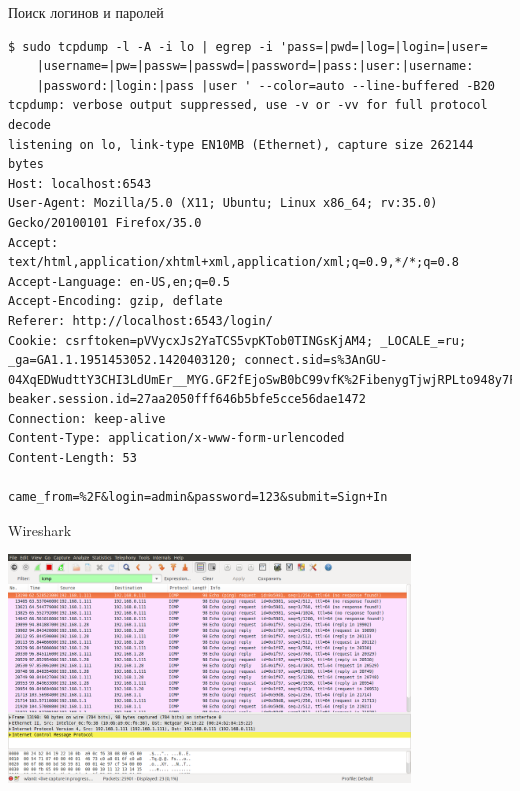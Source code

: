 \begin{frame}[fragile]{Поиск логинов и паролей}
    \begin{Verbatim}[fontsize=\scriptsize]
$ sudo tcpdump -l -A -i lo | egrep -i 'pass=|pwd=|log=|login=|user=
    |username=|pw=|passw=|passwd=|password=|pass:|user:|username:
    |password:|login:|pass |user ' --color=auto --line-buffered -B20
tcpdump: verbose output suppressed, use -v or -vv for full protocol decode
listening on lo, link-type EN10MB (Ethernet), capture size 262144 bytes
Host: localhost:6543
User-Agent: Mozilla/5.0 (X11; Ubuntu; Linux x86_64; rv:35.0) Gecko/20100101 Firefox/35.0
Accept: text/html,application/xhtml+xml,application/xml;q=0.9,*/*;q=0.8
Accept-Language: en-US,en;q=0.5
Accept-Encoding: gzip, deflate
Referer: http://localhost:6543/login/
Cookie: csrftoken=pVVycxJs2YaTCS5vpKTob0TINGsKjAM4; _LOCALE_=ru; _ga=GA1.1.1951453052.1420403120; connect.sid=s%3AnGU-04XqEDWudttY3CHI3LdUmEr__MYG.GF2fEjoSwB0bC99vfK%2FibenygTjwjRPLto948y7FSwU; beaker.session.id=27aa2050fff646b5bfe5cce56dae1472
Connection: keep-alive
Content-Type: application/x-www-form-urlencoded
Content-Length: 53

came_from=%2F&login=admin&password=123&submit=Sign+In
    \end{Verbatim}
\end{frame}

\begin{frame}{Wireshark}
    \begin{center}
        \includegraphics[width=4.2in]{media/wireshark-2.png}
    \end{center}
\end{frame}


